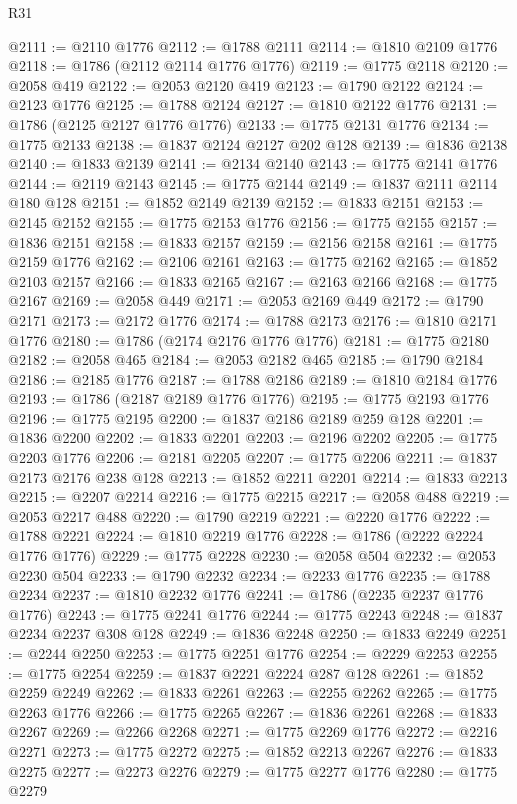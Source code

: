 \begin{lexlean}{R31}
\begin{coremodule}
@2111 := @2110 @1776
@2112 := @1788 @2111
@2114 := @1810 @2109 @1776
@2118 := @1786 (@2112 @2114 @1776 @1776)
@2119 := @1775 @2118
@2120 := @2058 @419
@2122 := @2053 @2120 @419
@2123 := @1790 @2122
@2124 := @2123 @1776
@2125 := @1788 @2124
@2127 := @1810 @2122 @1776
@2131 := @1786 (@2125 @2127 @1776 @1776)
@2133 := @1775 @2131 @1776
@2134 := @1775 @2133
@2138 := @1837 @2124 @2127 @202 @128
@2139 := @1836 @2138
@2140 := @1833 @2139
@2141 := @2134 @2140
@2143 := @1775 @2141 @1776
@2144 := @2119 @2143
@2145 := @1775 @2144
@2149 := @1837 @2111 @2114 @180 @128
@2151 := @1852 @2149 @2139
@2152 := @1833 @2151
@2153 := @2145 @2152
@2155 := @1775 @2153 @1776
@2156 := @1775 @2155
@2157 := @1836 @2151
@2158 := @1833 @2157
@2159 := @2156 @2158
@2161 := @1775 @2159 @1776
@2162 := @2106 @2161
@2163 := @1775 @2162
@2165 := @1852 @2103 @2157
@2166 := @1833 @2165
@2167 := @2163 @2166
@2168 := @1775 @2167
@2169 := @2058 @449
@2171 := @2053 @2169 @449
@2172 := @1790 @2171
@2173 := @2172 @1776
@2174 := @1788 @2173
@2176 := @1810 @2171 @1776
@2180 := @1786 (@2174 @2176 @1776 @1776)
@2181 := @1775 @2180
@2182 := @2058 @465
@2184 := @2053 @2182 @465
@2185 := @1790 @2184
@2186 := @2185 @1776
@2187 := @1788 @2186
@2189 := @1810 @2184 @1776
@2193 := @1786 (@2187 @2189 @1776 @1776)
@2195 := @1775 @2193 @1776
@2196 := @1775 @2195
@2200 := @1837 @2186 @2189 @259 @128
@2201 := @1836 @2200
@2202 := @1833 @2201
@2203 := @2196 @2202
@2205 := @1775 @2203 @1776
@2206 := @2181 @2205
@2207 := @1775 @2206
@2211 := @1837 @2173 @2176 @238 @128
@2213 := @1852 @2211 @2201
@2214 := @1833 @2213
@2215 := @2207 @2214
@2216 := @1775 @2215
@2217 := @2058 @488
@2219 := @2053 @2217 @488
@2220 := @1790 @2219
@2221 := @2220 @1776
@2222 := @1788 @2221
@2224 := @1810 @2219 @1776
@2228 := @1786 (@2222 @2224 @1776 @1776)
@2229 := @1775 @2228
@2230 := @2058 @504
@2232 := @2053 @2230 @504
@2233 := @1790 @2232
@2234 := @2233 @1776
@2235 := @1788 @2234
@2237 := @1810 @2232 @1776
@2241 := @1786 (@2235 @2237 @1776 @1776)
@2243 := @1775 @2241 @1776
@2244 := @1775 @2243
@2248 := @1837 @2234 @2237 @308 @128
@2249 := @1836 @2248
@2250 := @1833 @2249
@2251 := @2244 @2250
@2253 := @1775 @2251 @1776
@2254 := @2229 @2253
@2255 := @1775 @2254
@2259 := @1837 @2221 @2224 @287 @128
@2261 := @1852 @2259 @2249
@2262 := @1833 @2261
@2263 := @2255 @2262
@2265 := @1775 @2263 @1776
@2266 := @1775 @2265
@2267 := @1836 @2261
@2268 := @1833 @2267
@2269 := @2266 @2268
@2271 := @1775 @2269 @1776
@2272 := @2216 @2271
@2273 := @1775 @2272
@2275 := @1852 @2213 @2267
@2276 := @1833 @2275
@2277 := @2273 @2276
@2279 := @1775 @2277 @1776
@2280 := @1775 @2279

\end{coremodule}
\end{lexlean}
